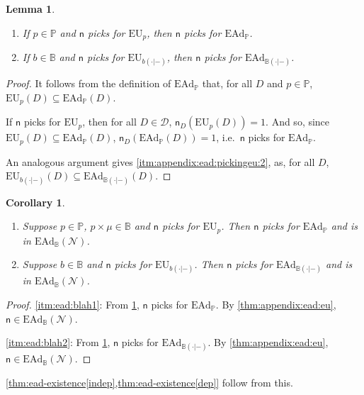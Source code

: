 \documentclass[a4paper,final]{article}
\newtheorem{lemma}[theorem]{Lemma}
\newtheorem{corollary}[theorem]{Corollary}
\renewcommand\P{\mathbb{P}} %
\newcommand\EU{\mathrm{EU}}
\newcommand\EAd{\mathrm{EAd}}
\newcommand{\Decs}{\mathcal{D}}
\newcommand{\n}{\mathsf{n}}
\renewcommand{\nu}{\n}
\newcommand\Nu{\mathcal{N}}
\newcommand{\IB}{\mathbb{B}}
\newcommand{\IP}{\P}
\newenvironment{CCM rewritten}
{\begingroup\color{blue}} %
{\endgroup}              %
\begin{document}
\begin{lemma}\label{thm:appendix:ead:pickingeu}\ 
	\begin{enumerate}[label=\normalfont(\roman*), ref=(\roman*)]
		\item\label{itm:appendix:ead:pickingeu:1} If $p\in \IP$ and $\nu$ picks for $\EU_p$, then $\nu$ picks for $\EAd_\IP$.
		\item\label{itm:appendix:ead:pickingeu:2}  If $b\in\IB$ and $\nu$ picks for $\EU_{b(\cdot|-)}$, then $\nu$ picks for $\EAd_{\IB(\cdot|-)}$. 
	\end{enumerate}
\end{lemma}
\begin{proof}
	It follows from the definition of $\EAd_\IP$ that, for all $D$ and $p \in \IP$, $\EU_p(D)\subseteq \EAd_\IP(D)$.
	
	If $\nu$ picks for $\EU_p$, then for all $D\in\Decs$, $\nu_D(\EU_p(D))=1$. And so, since  $\EU_p(D)\subseteq \EAd_\IP(D)$, $\nu_D(\EAd_\IP(D))=1$, i.e.~$\nu$ picks for $\EAd_\IP$. 
	
	An analogous argument gives \ref{itm:appendix:ead:pickingeu:2}, as,  for all $D$, $\EU_{b(\cdot|-)}(D)\subseteq\EAd_{\IB(\cdot|-)}(D)$. 
\end{proof}

\begin{corollary}\label{thm:appendix:ead:exists}\ 
	\begin{enumerate}[label=\normalfont(\roman*), ref=(\roman*)]
		\item \label{itm:ead:blah1}Suppose $p\in\IP$,  $p\times\mu\in\IB$ and $\nu$ picks for $\EU_p$. Then $\nu$ picks for $\EAd_\IP$ and is in $\EAd_\IB(\Nu)$. 
		\item \label{itm:ead:blah2}Suppose $b\in\IB$ and $\nu$ picks for $\EU_{b(\cdot|-)}$. Then $\nu$ picks for $\EAd_{\IB(\cdot|-)}$ and is in $\EAd_\IB(\Nu)$. 
	\end{enumerate}
\end{corollary}
\begin{proof}
	\ref{itm:ead:blah1}: From \cref{thm:appendix:ead:pickingeu}, $\nu$ picks for $\EAd_\IP$. By \cref{thm:appendix:ead:eu}, $\nu\in\EAd_\IB(\Nu)$. 
	
	\ref{itm:ead:blah2}: From \cref{thm:appendix:ead:pickingeu}, $\nu$ picks for $\EAd_{\IB(\cdot|-)}$. By \cref{thm:appendix:ead:eu}, $\nu\in\EAd_\IB(\Nu)$. 
\end{proof}
\cref{thm:ead-existence[indep],thm:ead-existence[dep]} follow from this.
\end{document}
